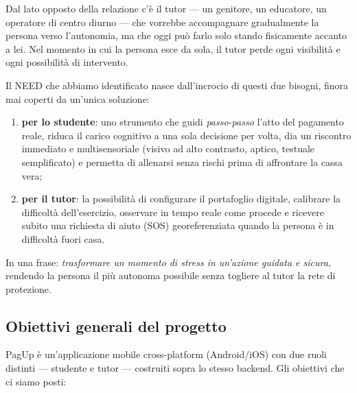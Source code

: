 \documentclass[11pt,a4paper]{article}
\begin{document}
Dal lato opposto della relazione c'\`e il tutor --- un genitore, un educatore, un operatore di
centro diurno --- che vorrebbe accompagnare gradualmente la persona verso l'autonomia, ma che oggi
pu\`o farlo solo stando fisicamente accanto a lei. Nel momento in cui la persona esce da sola, il
tutor perde ogni visibilit\`a e ogni possibilit\`a di intervento.

Il NEED che abbiamo identificato nasce dall'incrocio di questi due bisogni, finora mai coperti
da un'unica soluzione:

\begin{enumerate}[leftmargin=1.4cm]
  \item \textbf{per lo studente}: uno strumento che guidi \emph{passo-passo} l'atto del pagamento
  reale, riduca il carico cognitivo a una sola decisione per volta, dia un riscontro immediato e
  multisensoriale (visivo ad alto contrasto, aptico, testuale semplificato) e permetta di
  allenarsi senza rischi prima di affrontare la cassa vera;
  \item \textbf{per il tutor}: la possibilit\`a di configurare il portafoglio digitale, calibrare
  la difficolt\`a dell'esercizio, osservare in tempo reale come procede e ricevere subito una
  richiesta di aiuto (SOS) georeferenziata quando la persona \`e in difficolt\`a fuori casa.
\end{enumerate}

In una frase: \emph{trasformare un momento di stress in un'azione guidata e sicura}, rendendo la
persona il pi\`u autonoma possibile senza togliere al tutor la rete di protezione.

\subsection{Obiettivi generali del progetto}

PagUp \`e un'applicazione mobile cross-platform (Android/iOS) con due ruoli distinti --- studente
e tutor --- costruiti sopra lo stesso backend. Gli obiettivi che ci siamo posti:
\end{document}
